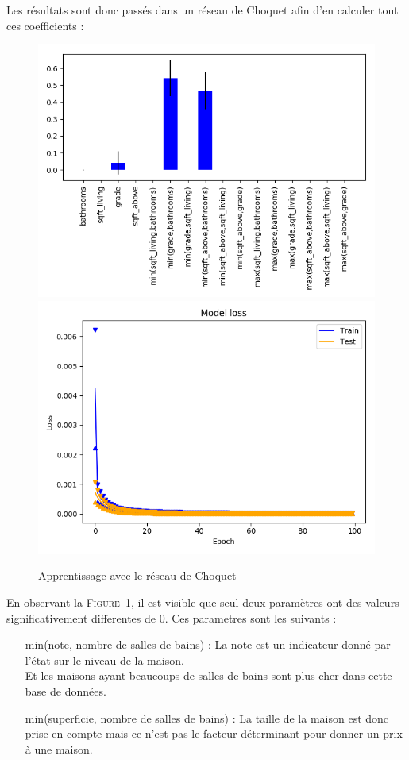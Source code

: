 Les résultats sont donc passés dans un réseau de Choquet afin d'en calculer tout ces coefficients :
\begin{figure}[H]
    \center
    \includegraphics[height=\moyen]{pict/real/netch.png}
    \includegraphics[height=\petit]{pict/real/learnch.png}
	\caption{Apprentissage avec le réseau de Choquet}
	\label{fig:real-Choquet}
\end{figure}

En observant la \textsc{Figure}\ \ref{fig:real-Choquet}, il est visible que seul deux paramètres
ont des valeurs significativement differentes de $0$.
Ces parametres sont les suivants :
\begin{itemize}
    \item[min(note, nombre de salles de bains) :] La note est un indicateur donné par l'état sur le niveau de la maison.\\
        Et les maisons ayant beaucoups de salles de bains sont plus cher dans cette base de données.
    \item[min(superficie, nombre de salles de bains) :] La taille de la maison est donc prise en compte
        mais ce n'est pas le facteur déterminant pour donner un prix à une maison.
\end{itemize}



